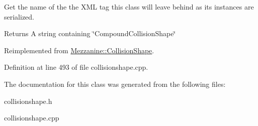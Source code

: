 Get the name of the the XML tag this class will leave behind as its instances are serialized. 

\begin{DoxyReturn}{Returns}
A string containing \char`\"{}CompoundCollisionShape\char`\"{} 
\end{DoxyReturn}


Reimplemented from \hyperlink{classMezzanine_1_1CollisionShape_ae5a97a76b687d450f17d0ac86b227f1d}{Mezzanine::CollisionShape}.



Definition at line 493 of file collisionshape.cpp.



The documentation for this class was generated from the following files:\begin{DoxyCompactItemize}
\item 
collisionshape.h\item 
collisionshape.cpp\end{DoxyCompactItemize}
